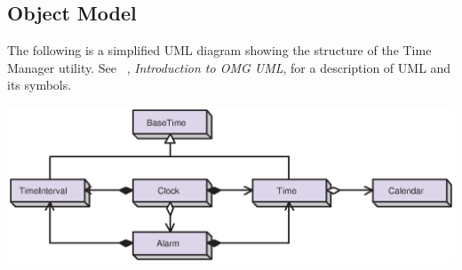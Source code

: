 
\pagebreak
\subsection{Object Model}

The following is a simplified UML diagram showing the structure of the
Time Manager utility.  See ~\cite{UML}, {\it Introduction to OMG UML}, for a
description of UML and its symbols.

\begin{center}
\includegraphics{TimeMgr_obj.eps}   
\end{center}

